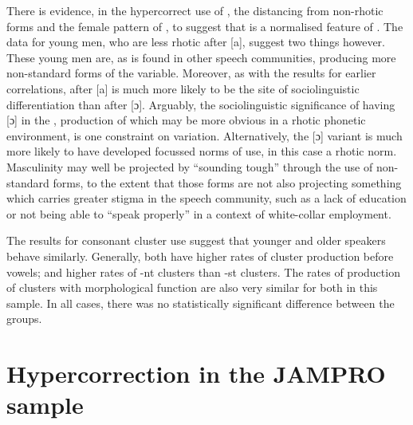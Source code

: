 There is evidence, in the hypercorrect use of , the distancing from non-rhotic  forms and the female pattern of , to suggest that  is a normalised feature of .  The data for young men, who are less rhotic after [a], suggest two things however.  These young men are, as is found in other speech communities, producing more non-stan\-dard forms of the variable.  Moreover, as with the results for earlier correlations,  after [a] is much more likely to be the site of sociolinguistic differentiation than after [ɔ].  Arguably, the sociolinguistic significance of having [ɔ] in the , production of which may be more obvious in a rhotic phonetic environment, is one constraint on variation.  Alternatively, the [ɔ] variant is much more likely to have developed focussed norms of use, in this case a rhotic norm.  Masculinity may well be projected by “sounding tough” through the use of non-stan\-dard forms, to the extent that those forms are not also projecting something which carries greater stigma in the speech community, such as a lack of education or not being able to “speak properly” in a context of white-collar employment.  

The results for consonant cluster use suggest that younger and older speakers behave similarly.  Generally, both  have higher rates of cluster production before vowels; and higher rates of -nt clusters than -st clusters.  The rates of production of clusters with morphological function are also very similar for both  in this sample.  In all cases, there was no statistically significant difference between the  groups. 

\section{Hypercorrection in the JAMPRO sample}\label{sec:3.5}

